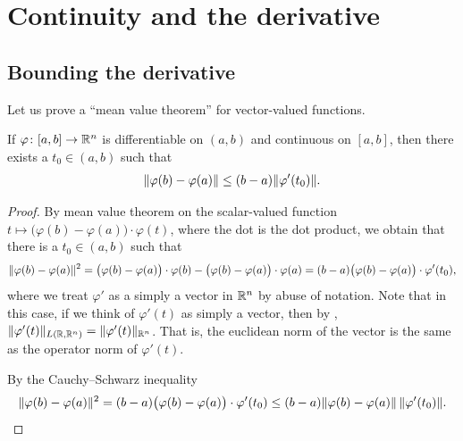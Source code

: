 
\sectionnewpage
\section{Continuity and the derivative}
\label{sec:svthedercont}


\subsection{Bounding the derivative}

Let us prove a ``mean value theorem'' for vector-valued functions.

\begin{lemma}
If $\varphi \colon [a,b] \to {\mathbb{R}}^n$ is differentiable on $(a,b)$ and
continuous on $[a,b]$, then there exists a $t_0 \in (a,b)$ such that
\begin{equation*}
\lVert {\varphi(b)-\varphi(a)} \rVert \leq (b-a) \lVert {\varphi'(t_0)} \rVert .
\end{equation*}
\end{lemma}

\begin{proof}
By mean value theorem on the scalar-valued function
$t \mapsto \bigl(\varphi(b)-\varphi(a) \bigr) \cdot \varphi(t)$,
where the dot is the dot product, we obtain
that
there is a $t_0 \in (a,b)$ such that
\begin{equation*}
\lVert {\varphi(b)-\varphi(a)} \rVert^2
=
\bigl(\varphi(b)-\varphi(a) \bigr) \cdot \varphi(b) - 
\bigl(\varphi(b)-\varphi(a) \bigr) \cdot \varphi(a)
= 
(b-a)
\bigl(\varphi(b)-\varphi(a) \bigr) \cdot \varphi'(t_0) ,
\end{equation*}
where we treat $\varphi'$ as a simply a vector in ${\mathbb{R}}^n$ by abuse of
notation.  Note that
in this case, if we think of $\varphi'(t)$ as simply a vector, then by
,
$\lVert {\varphi'(t)} \rVert_{L({\mathbb{R}},{\mathbb{R}}^n)} = \lVert {\varphi'(t)} \rVert_{{\mathbb{R}}^n}$.
That is, the euclidean norm of the vector is the same as the operator norm
of $\varphi'(t)$.

By the Cauchy--Schwarz inequality
\begin{equation*}
\lVert {\varphi(b)-\varphi(a)} \rVert^2
=
(b-a)\bigl(\varphi(b)-\varphi(a) \bigr) \cdot \varphi'(t_0)
\leq
(b-a)
\lVert {\varphi(b)-\varphi(a)} \rVert \, \lVert {\varphi'(t_0)} \rVert . \qedhere
\end{equation*}
\end{proof}

